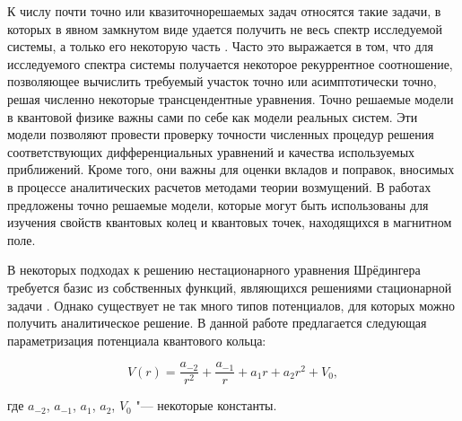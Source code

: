 К числу почти точно или квазиточнорешаемых задач относятся такие задачи, в которых в явном замкнутом виде удается получить не весь спектр исследуемой системы, а только его некоторую часть \cite{antropova:bib:Ushveridze1989}. Часто это выражается в том, что для исследуемого спектра системы получается некоторое рекуррентное соотношение, позволяющее вычислить требуемый участок точно или асимптотически точно, решая численно некоторые трансцендентные уравнения. Точно решаемые модели в квантовой физике важны сами по себе как модели реальных систем.  Эти модели позволяют провести проверку точности численных процедур решения соответствующих дифференциальных уравнений и качества используемых приближений. Кроме того, они важны для оценки вкладов и поправок, вносимых в процессе аналитических расчетов методами теории возмущений. В работах \cite{antropova:bib:TanInkson1996, antropova:bib:Mavromatis2000} предложены точно решаемые модели, которые могут быть использованы для изучения свойств квантовых колец и квантовых точек, находящихся в магнитном поле.



В некоторых подходах к решению нестационарного уравнения Шрёдингера требуется базис из собственных функций, являющихся решениями стационарной задачи \cite{antropova:bib:BK2010}. Однако существует не так много типов потенциалов, для которых можно получить аналитическое решение. В данной работе предлагается следующая параметризация потенциала квантового кольца:

\begin{equation}\label{antropova:eq:V}

    V(r)=\frac{a_{-2}}{r^2}+\frac{a_{-1}}{r}+a_1r+a_2r^2+V_0,

\end{equation}

где $a_{-2}$, $a_{-1}$, $a_1$, $a_2$, $V_0$ "--- некоторые константы.












